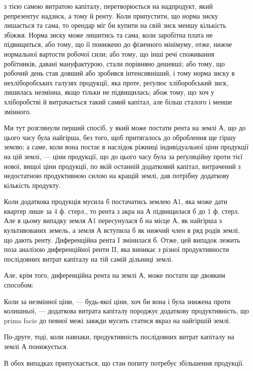 \parcont{}  %
з тією самою витратою капіталу, перетворюється на надпродукт, який репрезентує
надзиск, а тому й ренту. Коли припустити, що норма зиску лишається
та сама, то орендар міг би купити на свій зиск меншу кількість збіжжя.
Норма зиску може лишитись та сама, коли заробітна плата не підвищиться,
або тому, що її понижено до фізичного мінімуму, отже, нижче нормальної вартости
робочої сили; або тому, що інші речі споживання робітників, давані мануфактурою,
стали порівняно дешевші; або тому, що робочий день став довший
або зробився інтенсивніший, і тому норма зиску в нехліборобських галузях
продукції, яка проте, реґулює хліборобський зиск, лишилась незмінна, якщо
тільки не підвищилась; абож тому, що хоч у хліборобстві й витрачається такий
самий капітал, але більш сталого і менше змінного.

Ми тут розглянули перший спосіб, у який може постати рента на землі
А, що до цього часу була найгірша, без того, щоб притягалось до оброблення
ще гіршу землю; а саме, коли вона постає в наслідок ріжниці індивідуальної
ціни продукції на цій землі, — ціни продукції, що до цього часу була за
реґуляційну проти тієї нової, вищої ціни продукції, по якій останній додатковий
капітал, витрачений з недостатною продуктивною силою на кращій землі,
дав потрібну додаткову кількість продукту.

Коли додаткова продукція мусила б постачатись землею А1, яка може дати
квартер лише за 4 ф. стерл., то рента з акра на А підвищилася б до 1 ф. стерл. Але в цьому випадку
земля А1 пересунулася б на місце А, як
найгірша з культивованих земель, а земля А вступила б як нижчий член в
ряд родів землі, що дають ренту. Диференційна рента I змінилася б. Отже,
цей випадок лежить поза аналізою диференційної ренти II, яка виникає з різної
продуктивности послідовних витрат капіталу на тій самій дільниці землі.

Але, крім того, диференційна рента на землі А, може постати ще двояким
способом:

Коли за незмінної ціни, — будь-якої ціни, хоч би вона і була знижена
проти колишньої, — додаткова витрата капіталу породжує додаткову продуктивність,
що prima facie до певної межі завжди мусить статися якраз на найгіршій
землі.

По-друге, тоді, коли навпаки, продуктивність послідовних витрат капіталу
на землі А понижується.

В обох випадках припускається, що стан попиту потребує збільшення
продукції.

